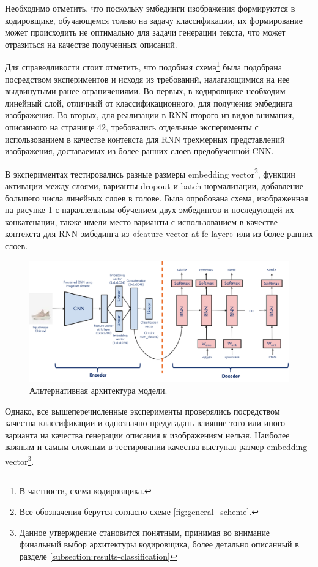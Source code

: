 \documentclass[a4paper,12pt]{extarticle}
\begin{document}
Необходимо отметить, что поскольку эмбединги изображения формируются в кодировщике, обучающемся только на задачу классификации, их формирование может происходить не оптимально для задачи генерации текста, что может отразиться на качестве полученных описаний.

Для справедливости стоит отметить, что подобная схема\footnote{В частности, схема кодировщика.} была подобрана посредством экспериментов и исходя из требований, налагающимися на нее выдвинутыми ранее ограничениями. Во-первых, в кодировщике необходим линейный слой, отличный от классификационного, для получения эмбединга изображения. Во-вторых, для реализации в RNN второго из видов внимания, описанного на странице 42, требовались отдельные эксперименты с использованием в качестве контекста для RNN трехмерных представлений изображения, доставаемых из более ранних слоев предобученной CNN.

В экспериментах тестировались разные размеры embedding vector\footnote{Все обозначения берутся согласно схеме \ref{fig:general_scheme}.}, функции активации между слоями, варианты dropout и batch-нормализации, добавление большего числа линейных слоев в голове. Была опробована схема, изображенная на рисунке \ref{fig:general_scheme2} с параллельным обучением двух эмбедингов и последующей их конкатенации, также имели место варианты с использованием в качестве контекста для RNN эмбединга из «feature vector at fc layer» или из более ранних слоев. 
\begin{figure}[ht]
	\centering
	\includegraphics[scale=0.55]{classification/general_schemev2.png}
	\caption{Альтернативная архитектура модели.}
	\label{fig:general_scheme2}
\end{figure}
Однако, все вышеперечисленные эксперименты проверялись посредством качества классификации и однозначно предугадать влияние того или иного варианта на качества генерации описания к изображениям нельзя. Наиболее важным и самым сложным в тестировании качества выступал размер embedding vector\footnote{Данное утверждение становится понятным, принимая во внимание финальный выбор архитектуры кодировщика, более детально описанный в разделе \ref{subsection:results-classification}}.
\end{document}

